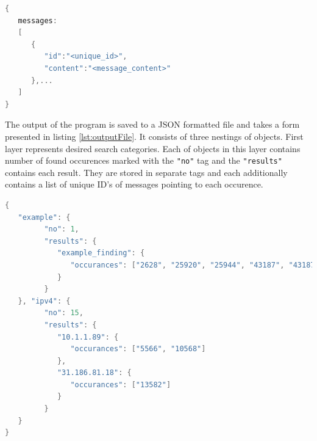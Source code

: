 \documentclass[a4paper,twoside,12pt]{book}
\begin{document}
\begin{lstlisting}[float=!ht,language=C,label=lst:inputFormat,caption={Format of the input JSON file.},frame=lines,framexleftmargin=0.5em,captionpos=b,escapechar=^,texcl=true,breaklines=true]
{
   messages:
   [
      {
         "id":"<unique_id>",
         "content":"<message_content>"
      },...
   ]
}
\end{lstlisting}


The output of the program is saved to a JSON formatted file and takes a form presented in listing \ref{lst:outputFile}. 
It consists of three nestings of objects. First layer represents desired search categories. Each of objects in
this layer contains number of found occurences marked with the \lstinline|"no"| tag and the \lstinline|"results"| contains each
result. They are stored in separate tags and each additionally contains a list of unique ID's of messages 
pointing to each occurence.  

\begin{lstlisting}[float=!ht,language=C++,label=lst:outputFile,caption={Example output file.},frame=lines,framexleftmargin=0.5em,captionpos=b,escapechar=^,texcl=true,breaklines=true]
{
   "example": {
         "no": 1, 
         "results": {
            "example_finding": {
               "occurances": ["2628", "25920", "25944", "43187", "43187"]
            }
         }   
   }, "ipv4": {
         "no": 15, 
         "results": {
            "10.1.1.89": {
               "occurances": ["5566", "10568"]
            }, 
            "31.186.81.18": {
               "occurances": ["13582"]
            }
         }
   }
}
\end{lstlisting}

\end{document}

